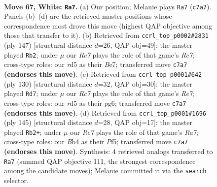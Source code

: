 \documentclass[11pt]{article}
\begin{document}
\clearpage

\begin{figure}[p]\centering
\begin{subfigure}{0.46\textwidth}\centering
\resizebox{\linewidth}{!}{%
\newchessgame
\chessboard[
  setfen={8/2R2pk1/5n2/3r4/pB3P1p/P3K2P/8/8 w - - 9 67},
  showmover=false,
  pgfstyle=straightmove, color=movearrow, markmove={c7-a7}
]}
\caption{}
\end{subfigure}\hfill
\begin{subfigure}{0.46\textwidth}\centering
\resizebox{\linewidth}{!}{%
\newchessgame
\chessboard[
  setfen={7R/4b3/8/5k2/4p2p/4P3/2r2PKN/8 b - - 5 74},
  showmover=false,
  pgfstyle=straightmove, color=movearrow, markmove={c2-b2}
]}
\caption{}
\end{subfigure}
\\[4pt]
\begin{subfigure}{0.46\textwidth}\centering
\resizebox{\linewidth}{!}{%
\newchessgame
\chessboard[
  setfen={7k/4R2p/3n2p1/8/3r2PP/5P1K/4B3/8 w - - 1 66},
  showmover=false,
  pgfstyle=straightmove, color=movearrow, markmove={e7-d7}
]}
\caption{}
\end{subfigure}\hfill
\begin{subfigure}{0.46\textwidth}\centering
\resizebox{\linewidth}{!}{%
\newchessgame
\chessboard[
  setfen={8/5k2/PK3p2/5ppp/2P5/6P1/r7/4R3 b - - 8 73},
  showmover=false,
  pgfstyle=straightmove, color=movearrow, markmove={a2-b2}
]}
\caption{}
\end{subfigure}
\caption{\textbf{Move 67, White: \texttt{Ra7}.} (a) Our position; Melanie plays \texttt{Ra7} (\texttt{c7a7}). Panels (b)--(d) are the retrieved master positions whose correspondence most drove this move (highest QAP objective among those that transfer to it). (b) Retrieved from \texttt{ccrl\_top\_p0002\#2831} (ply 147) [structural distance $d$=26, QAP obj=49]: the master played \texttt{Rb2}; under $\mu$ our \emph{Rc7} plays the role of that game's \emph{Rc7}; cross-type roles: our \emph{r}d5 as their \emph{B}e7; transferred move \texttt{c7a7} \textbf{(endorses this move)}. (c) Retrieved from \texttt{ccrl\_top\_p0001\#642} (ply 130) [structural distance $d$=32, QAP obj=30]: the master played \texttt{Rd7}; under $\mu$ our \emph{Rc7} plays the role of that game's \emph{Re7}; cross-type roles: our \emph{r}d5 as their \emph{p}g6; transferred move \texttt{c7a7} \textbf{(endorses this move)}. (d) Retrieved from \texttt{ccrl\_top\_p0001\#1696} (ply 145) [structural distance $d$=28, QAP obj=17]: the master played \texttt{Rb2+}; under $\mu$ our \emph{Rc7} plays the role of that game's \emph{Ra7}; cross-type roles: our \emph{B}b4 as their \emph{P}f5; transferred move \texttt{c7a7} \textbf{(endorses this move)}. Synthesis: 4 retrieved analogs transferred to \texttt{Ra7} (summed QAP objective 111, the strongest correspondence among the candidate moves); Melanie committed it via the \texttt{search} selector.}
\label{fig:thought-m132}
\end{figure}
\end{document}
